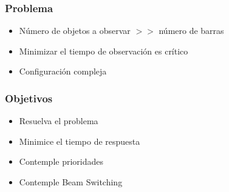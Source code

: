 \begin{frame}
    \frametitle{Problema}
    \begin{itemize}[<+->]
		\item Número de objetos a observar $>>$ número de barras
    \item Minimizar el tiempo de observación es crítico
    \item Configuración compleja
    \end{itemize}
    \endblock{}
\end{frame}

\begin{frame}
    \frametitle{Objetivos}
      \begin{itemize}[<+->]
      \item Resuelva el problema
      \item Minimice el tiempo de respuesta
      \item Contemple prioridades
      \item Contemple Beam Switching
      \end{itemize}
    \endblock{}
\end{frame}

